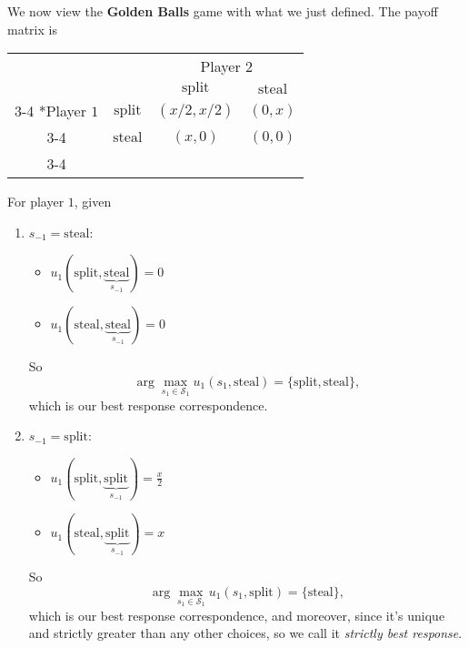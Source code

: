 \begin{prev}
	We now view the \textbf{Golden Balls} game with what we just defined. The payoff matrix is
	\begin{table}[H]
		\centering
		\setlength{\extrarowheight}{2pt}
		\begin{tabular}{cc|c|c|}
			                          & \multicolumn{1}{c}{} & \multicolumn{2}{c}{Player $2$}                                              \\
			                          & \multicolumn{1}{c}{} & \multicolumn{1}{c}{$\mathrm{split}$} & \multicolumn{1}{c}{$\mathrm{steal}$} \\\cline{3-4}
			\multirow{2}*{Player $1$} & $\mathrm{split}$     & $(x/2, x/2)$                         & $(0, x)$                             \\\cline{3-4}
			                          & $\mathrm{steal}$     & $(x, 0)$                             & $(0, 0)$                             \\\cline{3-4}
		\end{tabular}
	\end{table}

	For player \(1\), given
	\begin{enumerate}
		\item \(s_{-1} = \mathrm{steal}\):
		      \begin{itemize}
			      \item \(u_1(\mathrm{split} , \underbrace{\mathrm{steal}}_{s_{-1}} ) = 0\)
			      \item \(u_1(\mathrm{steal} , \underbrace{\mathrm{steal}}_{s_{-1}} ) = 0\)
		      \end{itemize}
		      So
		      \[
			      \arg\max_{s_1\in \mathcal{S}_1} u_1(s_1, \mathrm{steal} ) = \{\mathrm{split}, \mathrm{steal}  \},
		      \]
		      which is our best response correspondence.
		\item \(s_{-1} = \mathrm{split}\):
		      \begin{itemize}
			      \item \(u_1(\mathrm{split} , \underbrace{\mathrm{split}}_{s_{-1}} ) = \frac{x}{2}\)
			      \item \(u_1(\mathrm{steal} , \underbrace{\mathrm{split}}_{s_{-1}} ) = x\)
		      \end{itemize}
		      So
		      \[
			      \arg\max_{s_1\in \mathcal{S}_1} u_1(s_1, \mathrm{split} ) = \{\mathrm{steal}\},
		      \]
		      which is our best response correspondence, and moreover, since it's unique and strictly greater than any other choices, so we call it \emph{strictly best response}.
	\end{enumerate}
\end{prev}

